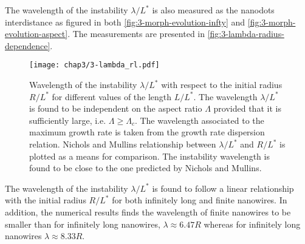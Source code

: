 The wavelength of the instability $\lambda/L^*$ is also measured as the nanodots interdistance as figured in both \autoref{fig:3-morph-evolution-infty} and \autoref{fig:3-morph-evolution-aspect}. The measurements are presented in \autoref{fig:3-lambda-radius-dependence}. 
\begin{figure}[H]
    \centering
    \texttt{[image: chap3/3-lambda\_rl.pdf]}
    \caption{Wavelength of the instability $\lambda/L^*$ with respect to the initial radius $R/L^*$ for different values of the length $L/L^*$. The wavelength $\lambda/L^*$ is found to be independent on the aspect ratio $\Lambda$ provided that it is sufficiently large, i.e. $\Lambda \geq \Lambda_c$. The wavelength associated to the maximum growth rate is taken from the growth rate dispersion relation. Nichols and Mullins \cite{NicholsMullins1965} relationship between $\lambda/L^*$ and $R/L^*$ is plotted as a means for comparison. The instability wavelength is found to be close to the one predicted by Nichols and Mullins.}
    \label{fig:3-lambda-radius-dependence}
\end{figure}

The wavelength of the instability $\lambda/L^*$ is found to follow a linear relationship with the initial radius $R/L^*$ for both infinitely long and finite nanowires. In addition, the numerical results finds the wavelength of finite nanowires to be smaller than for infinitely long nanowires, $\lambda \approx 6.47 R$ whereas for infinitely long nanowires $\lambda \approx 8.33 R$.

